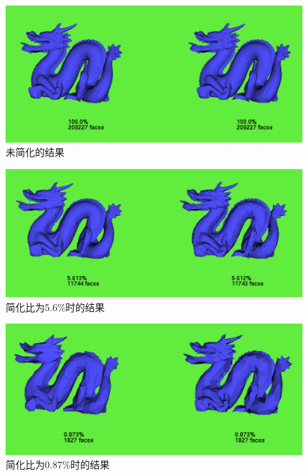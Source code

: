 \begin{figure}[!htbp]
    \centering
    \includegraphics[width=\columnwidth]{100.png}
    \caption{未简化的结果}
    \label{fig:org}
\end{figure}

\begin{figure}[!htbp]
    \centering
    \includegraphics[width=\columnwidth]{5.612.png}
    \caption{简化比为5.6\%时的结果}
    \label{fig:sim1}
\end{figure}

\begin{figure}[!htbp]
    \centering
    \includegraphics[width=\columnwidth]{0.873.png}
    \caption{简化比为0.87\%时的结果}
    \label{fig:sim2}
\end{figure}

